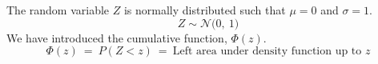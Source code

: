 \documentclass[12pt,letterpaper]{article}
\newcommand{\N}[2]{\mathcal{N}\Big(#1,~ #2\Big)}
\begin{document}
The random variable $Z$ is normally distributed such that $\mu=0$ and $\sigma=1$. 
$$Z\sim \N{0}{1} $$
We have introduced the cumulative function, $\Phi(z)$.
$$\Phi(z) ~=~ P(Z < z) ~=~ \text{Left area under density function up to }z $$
\end{document}
